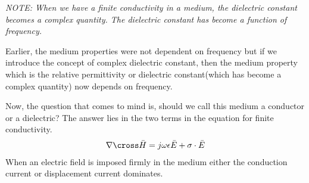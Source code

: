 \textit{NOTE: When we have a finite conductivity in a medium, the dielectric constant becomes a complex quantity. The dielectric constant has become a function of frequency.}

Earlier, the medium properties were not dependent on frequency but if we introduce the concept of complex dielectric constant, then the medium property which is the relative permittivity or dielectric constant(which has become a complex quantity) now depends on frequency.

Now, the question that comes to mind is, should we call this medium a conductor or a dielectric? The answer lies in the two terms in the equation for finite conductivity.
\begin{align*}
\nabla \cross \bar{H} = j\omega\epsilon\bar{E} + \sigma\cdot\bar{E} 
\end{align*}
When an electric field is imposed firmly in the medium either the conduction current or displacement current dominates.

